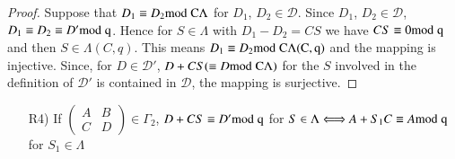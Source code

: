 \begin{proof}
Suppose that $D_{1}\equiv D_{2}\rm{mod} \; C\Lambda$ for $D_{1}$,
$D_{2}\in\mathscr{D}$. Since $D_{1}$, $D_{2}\in\mathscr{D}$,
$D_{1}\equiv D_{2}\equiv D'\rm{mod} \; q$. Hence for $S\in\Lambda$ with
$D_{1}-D_{2}=CS$ we have $CS\equiv 0\rm{mod} \; q$ and then
$S\in\Lambda(C,q)$. This means $D_{1}\equiv D_{2}\rm{mod} \; C\Lambda(C,q)$
and the mapping is injective. Since, for $D\in\mathscr{D}'$,
$D+CS(\equiv D\rm{mod} \; C\Lambda)$ for the $S$ involved in the definition
of $\mathscr{D}'$ is contained in $\mathscr{D}$, the mapping is
surjective.
\end{proof}

\begin{itemize}
\item[R4)] If $\left(\begin{smallmatrix} A & B\\ C & D
\end{smallmatrix}\right)\in\Gamma_{2}$, $D+CS\equiv D'\rm{mod} \; q$ for
  $S\in\Lambda\Longleftrightarrow A+S_{1}C\equiv A\rm{mod} \; q$ for
  $S_{1}\in \Lambda$
\end{itemize}

